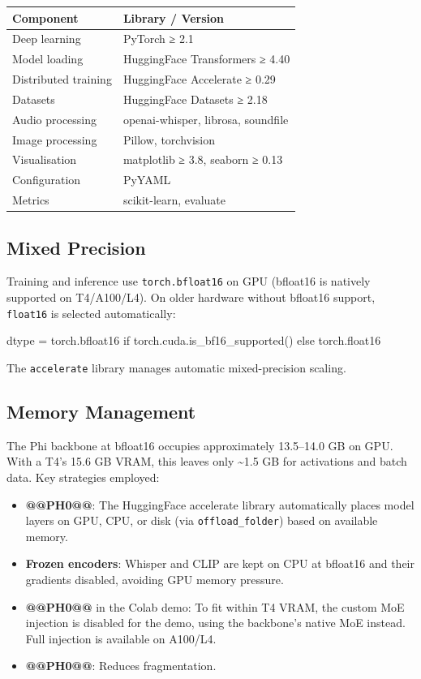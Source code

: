 \documentclass[11pt]{article}
\begin{document}
\begin{longtable}{|>{\raggedright\arraybackslash}p{}|>{\raggedright\arraybackslash}p{}|}
\hline
\textbf{Component} & \textbf{Library / Version} \\ \hline
Deep learning & PyTorch ≥ 2.1 \\ \hline
Model loading & HuggingFace Transformers ≥ 4.40 \\ \hline
Distributed training & HuggingFace Accelerate ≥ 0.29 \\ \hline
Datasets & HuggingFace Datasets ≥ 2.18 \\ \hline
Audio processing & openai-whisper, librosa, soundfile \\ \hline
Image processing & Pillow, torchvision \\ \hline
Visualisation & matplotlib ≥ 3.8, seaborn ≥ 0.13 \\ \hline
Configuration & PyYAML \\ \hline
Metrics & scikit-learn, evaluate \\ \hline
\end{longtable}

\subsection{Mixed Precision}


Training and inference use \texttt{torch.bfloat16} on GPU (bfloat16 is natively supported on T4/A100/L4). On older hardware without bfloat16 support, \texttt{float16} is selected automatically:


\begin{CodeBlock}
dtype = torch.bfloat16 if torch.cuda.is_bf16_supported() else torch.float16
\end{CodeBlock}


The \texttt{accelerate} library manages automatic mixed-precision scaling.


\subsection{Memory Management}


The Phi backbone at bfloat16 occupies approximately 13.5–14.0 GB on GPU. With a T4's 15.6 GB VRAM, this leaves only \textasciitilde{}1.5 GB for activations and batch data. Key strategies employed:


\begin{itemize}[leftmargin=*]
\item \textbf{@@PH0@@}: The HuggingFace accelerate library automatically places model layers on GPU, CPU, or disk (via \texttt{offload\_folder}) based on available memory.
\item \textbf{Frozen encoders}: Whisper and CLIP are kept on CPU at bfloat16 and their gradients disabled, avoiding GPU memory pressure.
\item \textbf{@@PH0@@} in the Colab demo: To fit within T4 VRAM, the custom MoE injection is disabled for the demo, using the backbone's native MoE instead. Full injection is available on A100/L4.
\item \textbf{@@PH0@@}: Reduces fragmentation.

\end{itemize}
\end{document}
